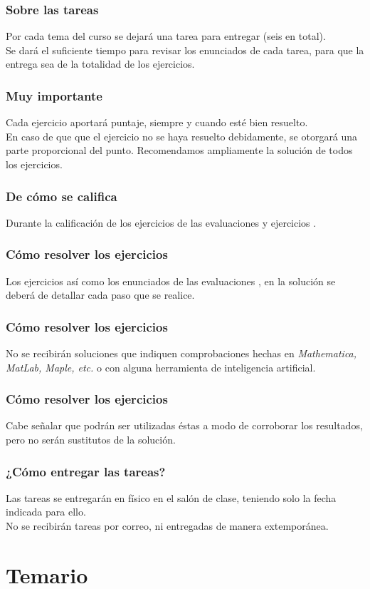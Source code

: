 \documentclass[12pt]{beamer}
\begin{document}
\begin{frame}
\frametitle{Sobre las tareas}
Por cada tema del curso se dejará una tarea para entregar (seis en total).
\\
\bigskip
\pause
Se dará el suficiente tiempo para revisar los enunciados de cada tarea, para que la entrega sea de la totalidad de los ejercicios.
\end{frame}
\begin{frame}
\frametitle{Muy importante}
Cada ejercicio aportará puntaje, siempre y cuando esté bien resuelto.
\\
\bigskip
\pause
En caso de que que el ejercicio no se haya resuelto debidamente, se otorgará una parte proporcional del punto. Recomendamos ampliamente la solución de todos los ejercicios.
\end{frame}
\begin{frame}
\frametitle{De cómo se califica}
Durante la calificación de los ejercicios de las evaluaciones y ejercicios \pause {}.
\end{frame}
\begin{frame}
\frametitle{Cómo resolver los ejercicios}
Los ejercicios así como los enunciados de las evaluaciones , en la solución se deberá de detallar cada paso que se realice.
\end{frame}
\begin{frame}
\frametitle{Cómo resolver los ejercicios}
No se recibirán soluciones que indiquen comprobaciones hechas en \emph{Mathematica, MatLab, Maple, etc.} o con alguna herramienta de inteligencia artificial.
\end{frame}
\begin{frame}
\frametitle{Cómo resolver los ejercicios}
Cabe señalar que podrán ser utilizadas éstas a modo de corroborar los resultados, pero no serán sustitutos de la solución.
\end{frame}
\begin{frame}
\frametitle{¿Cómo entregar las tareas?}
Las tareas se entregarán en físico en el salón de clase, teniendo solo la fecha indicada para ello.
\\
\bigskip
No se recibirán tareas por correo, ni entregadas de manera extemporánea.
\end{frame}

\section{Temario}
\end{document}

